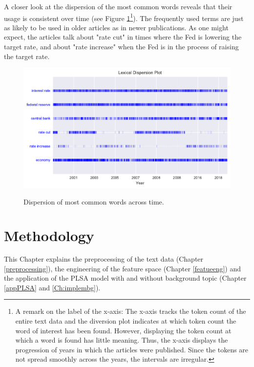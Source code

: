 \documentclass[11pt,a4paper,english,oneside]{book}
\numberwithin{equation}{chapter}
\begin{document}
A closer look at the dispersion of the most common words reveals that their usage is consistent over time (see Figure \ref{dispersion}\footnote{A remark on the label of the x-axis: The x-axis tracks the token count of the entire text data and the diversion plot indicates at which token count the word of interest has been found. However, displaying the token count at which a word is found has little meaning. Thus, the x-axis displays the progression of years in which the articles were published. Since the tokens are not spread smoothly across the years, the intervals are irregular.}). The frequently used terms are just as likely to be used in older articles as in newer publications. As one might expect, the articles talk about "rate cut" in times where the Fed is lowering the target rate, and about "rate increase" when the Fed is in the process of raising the target rate.

\begin{figure}
	\caption{Dispersion of most common words across time.}
	\centering
	\includegraphics[scale=1]{Images/dispersionplot.pdf}
	\label{dispersion}
\end{figure}

	


\section{Methodology}\label{methodology}

This Chapter explains the preprocessing of the text data (Chapter  \ref{preprocessing}), the engineering of the feature space (Chapter \ref{featueeng}) and the application of the PLSA model with and without background topic (Chapter \ref{appPLSA} and \ref{Ch:implembg}).
\end{document}
